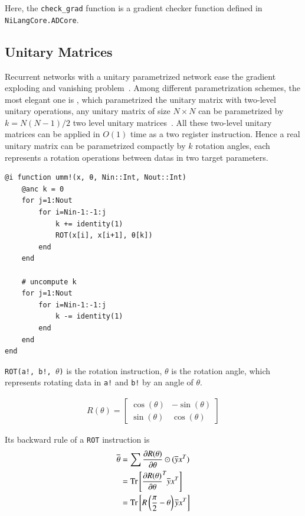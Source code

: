 \documentclass[aps,twocolumn,longbibliography,english,superscriptaddress,prr]{revtex4-1}
\newcommand{\<}{\langle}
\renewcommand{\>}{\rangle}
\newcommand{\Tr}{{\rm Tr}}
\theoremstyle{definition}\newtheorem{definition}{\textit{Definition}}
\begin{document}
Here, the \texttt{check\_grad} function is a gradient checker function defined in \texttt{NiLangCore.ADCore}.

\subsection{Unitary Matrices}
Recurrent networks with a unitary parametrized network ease the gradient exploding and vanishing problem~\cite{Arjovsky2015,Wisdom2016,Li2016}.
Among different parametrization schemes, the most elegant one is \cite{Li2016}, which parametrized the unitary matrix with two-level unitary operations, any unitary matrix of size $N\times N$ can be parametrized by $k = N(N-1)/2$ two level unitary matrices~\cite{Li2013}. All these two-level unitary matrices can be applied in $O(1)$ time as a two register instruction.
Hence a real unitary matrix can be parametrized compactly by $k$ rotation angles, each represents a rotation operations between datas in two target parameters.


\begin{minipage}{.44\textwidth}
\begin{lstlisting}
@i function umm!(x, θ, Nin::Int, Nout::Int)
    @anc k = 0
    for j=1:Nout
        for i=Nin-1:-1:j
            k += identity(1)
            ROT(x[i], x[i+1], θ[k])
        end
    end

    # uncompute k
    for j=1:Nout
        for i=Nin-1:-1:j
            k -= identity(1)
        end
    end
end
\end{lstlisting}
\end{minipage}

\texttt{ROT(a!, b!, $\theta$)} is the rotation instruction, \texttt{$\theta$} is the rotation angle, which represents rotating data in \texttt{a!} and \texttt{b!} by an angle of $\theta$.

\begin{align}
    R(\theta)  = \begin{bmatrix}
        \cos(\theta) & - \sin(\theta)\\
        \sin(\theta)  & \cos(\theta)
    \end{bmatrix}
\end{align}


Its backward rule of a \texttt{ROT} instruction is
\begin{align}
    \begin{split}
    \overline{\theta}  &= \sum\frac{\partial R(\theta)}{\partial \theta}\odot(\overline{y}x^T)\\
    &= \Tr\left[\frac{\partial R(\theta)}{\partial \theta}^T\overline{y}x^T\right]\\
    &= \Tr\left[R\left(\frac{\pi}{2}-\theta\right)\overline{y}x^T\right]
    \end{split}
\end{align}
\end{document}
